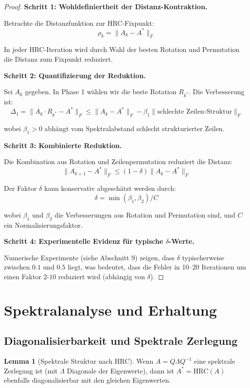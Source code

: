\documentclass[a4paper,12pt]{article}
\theoremstyle{definition}
\newtheorem{lemma}{Lemma}
\begin{document}
\begin{proof}
\textbf{Schritt 1: Wohldefiniertheit der Distanz-Kontraktion.}

Betrachte die Distanzfunktion zur HRC-Fixpunkt:
\[
\rho_k = \|A_k - A^*\|_F
\]

In jeder HRC-Iteration wird durch Wahl der besten Rotation und Permutation die Distanz zum Fixpunkt reduziert.

\textbf{Schritt 2: Quantifizierung der Reduktion.}

Sei $A_k$ gegeben. In Phase 1 wählen wir die beste Rotation $R_{k^*}$. Die Verbesserung ist:
\[
\Delta_1 = \|A_k \cdot R_{k^*} - A^*\|_F \leq \|A_k - A^*\|_F - \beta_1 \|\text{schlechte Zeilen-Struktur}\|_F
\]

wobei $\beta_1 > 0$ abhängt vom Spektralabstand schlecht strukturierter Zeilen.

\textbf{Schritt 3: Kombinierte Reduktion.}

Die Kombination aus Rotation und Zeilenpermutation reduziert die Distanz:
\[
\|A_{k+1} - A^*\|_F \leq (1 - \delta) \|A_k - A^*\|_F
\]

Der Faktor $\delta$ kann konservativ abgeschätzt werden durch:
\[
\delta = \min(\beta_1, \beta_2) / C
\]

wobei $\beta_1$ und $\beta_2$ die Verbesserungen aus Rotation und Permutation sind, und $C$ ein Normalisierungsfaktor.

\textbf{Schritt 4: Experimentelle Evidenz für typische $\delta$-Werte.}

Numerische Experimente (siehe Abschnitt 9) zeigen, dass $\delta$ typischerweise zwischen $0.1$ und $0.5$ liegt, was bedeutet, dass die Fehler in 10--20 Iterationen um einen Faktor $2$-$10$ reduziert wird (abhängig von $\delta$).
\end{proof}

\section{Spektralanalyse und Erhaltung}

\subsection{Diagonalisierbarkeit und Spektrale Zerlegung}

\begin{lemma}[Spektrale Struktur nach HRC]
Wenn $A = Q \Lambda Q^{-1}$ eine spektrale Zerlegung ist (mit $\Lambda$ Diagonale der Eigenwerte), dann ist $A^* = \text{HRC}(A)$ ebenfalls diagonalisierbar mit den gleichen Eigenwerten.
\end{lemma}
\end{document}
